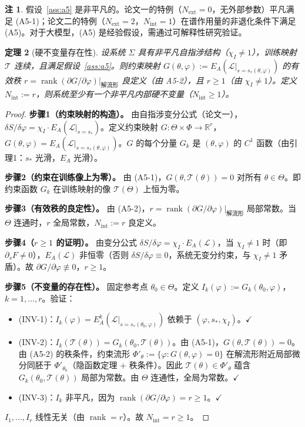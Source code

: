 \documentclass[12pt,a4paper]{article}
\newtheorem{theorem}{定理}[section]
\theoremstyle{definition}
\newtheorem{remark}[theorem]{注}
\newcommand{\mL}{\mathcal{L}}
\newcommand{\mT}{\mathcal{T}}
\newcommand{\mPhi}{\Phi}
\newcommand{\mTheta}{\Theta}
\newcommand{\R}{\mathbb{R}}
\newcommand{\chiI}{\chi_I}
\newcommand{\Nint}{N_{\mathrm{int}}}
\newcommand{\Next}{N_{\mathrm{ext}}}
\newcommand{\rank}{\operatorname{rank}}
\begin{document}
\begin{remark}
假设~\ref{ass:a5} 是非平凡的。论文一的特例（$\Next = 0$，无外部参数）平凡满足 (A5-1)；论文二的特例（$\Next = 2$，$\Nint = 1$）在谱作用量的非退化条件下满足 (A5)。对于大模型，(A5) 是经验假设，需通过可解释性研究验证。
\end{remark}

\begin{theorem}[硬不变量存在性]
\label{thm:inv-exist}
设系统 $\Sigma$ 具有非平凡自指涉结构（$\chiI \neq 1$），训练映射 $\mT$ 连续，且满足假设~\ref{ass:a5}。则约束映射 $G(\theta, \varphi) := E_A(\mL|_{s = s_*(\theta, \varphi)})$ 的有效秩 $r = \rank(\partial G / \partial \varphi)|_{\text{解流形}}$ 良定义（由 A5-2），且 $r \geq 1$（由 $\chiI \neq 1$）。定义 $\Nint := r$，则系统至少有一个非平凡内部硬不变量（$\Nint \geq 1$）。
\end{theorem}

\begin{proof}
\textbf{步骤1（约束映射的构造）。} 由自指涉变分公式（论文一），$\delta S / \delta \varphi = \chiI \cdot E_A(\mL|_{s = s_*})$。定义约束映射 $G: \mTheta \times \mPhi \to \R^r$，$G(\theta, \varphi) = E_A(\mL|_{s = s_*(\theta, \varphi)})$。$G$ 的每个分量 $G_k$ 是 $(\theta, \varphi)$ 的 $C^1$ 函数（由引理1：$s_*$ 光滑，$E_A$ 光滑）。

\textbf{步骤2（约束在训练像上为零）。} 由 (A5-1)，$G(\theta, \mT(\theta)) = 0$ 对所有 $\theta \in \mTheta$。即约束函数 $G_k$ 在训练映射的像 $\mT(\mTheta)$ 上恒为零。

\textbf{步骤3（有效秩的良定性）。} 由 (A5-2)，$r = \rank(\partial G / \partial \varphi)|_{\text{解流形}}$ 局部常数。当 $\mTheta$ 连通时，$r$ 全局常数，$\Nint := r$ 良定义。

\textbf{步骤4（$r \geq 1$ 的证明）。} 由变分公式 $\delta S / \delta \varphi = \chiI \cdot E_A(\mL)$，当 $\chiI \neq 1$ 时（即 $\partial_s F \neq 0$），$E_A(\mL)$ 非恒零（否则 $\delta S / \delta \varphi \equiv 0$，系统无变分约束，与 $\chiI \neq 1$ 矛盾）。故 $\partial G / \partial \varphi \not\equiv 0$，$r \geq 1$。

\textbf{步骤5（不变量的存在性）。} 固定参考点 $\theta_0 \in \mTheta$。定义 $I_k(\varphi) := G_k(\theta_0, \varphi)$，$k = 1, \ldots, r$。验证：
\begin{itemize}[leftmargin=*]
\item (INV-1)：$I_k(\varphi) = E_A^k(\mL|_{s = s_*(\theta_0, \varphi)})$ 依赖于 $(\varphi, s_*, \chiI)$。$\checkmark$
\item (INV-2)：$I_k(\mT(\theta)) = G_k(\theta_0, \mT(\theta))$。由 (A5-1)，$G(\theta, \mT(\theta)) = 0$。由 (A5-2) 的秩条件，约束流形 $\Phi'_\theta := \{\varphi : G(\theta, \varphi) = 0\}$ 在解流形附近局部微分同胚于 $\Phi'_{\theta_0}$（隐函数定理 + 秩条件）。因此 $\mT(\theta) \in \Phi'_\theta$ 蕴含 $G_k(\theta_0, \mT(\theta))$ 局部为常数。由 $\mTheta$ 连通性，全局为常数。$\checkmark$
\item (INV-3)：$I_k$ 非平凡，因为 $\rank(\partial G / \partial \varphi) = r \geq 1$。$\checkmark$
\end{itemize}
$I_1, \ldots, I_r$ 线性无关（由 $\rank = r$）。故 $\Nint = r \geq 1$。
\end{proof}
\end{document}
